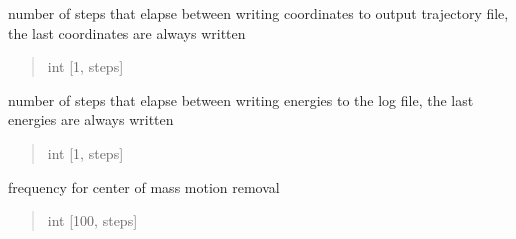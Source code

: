 \documentclass[letterpaper,10pt,english]{sphinxmanual}
\begin{document}
\begin{fulllineitems}
\begin{fulllineitems}
\end{fulllineitems}


\begin{fulllineitems}
\label{\detokenize{modules/dynamics:hps.dynamics.Dynamics.nstxout}}
\pysigstartsignatures
{}
\pysigstopsignatures
\sphinxAtStartPar
number of steps that elapse between writing coordinates to output trajectory file,
the last coordinates are always written
\begin{quote}\begin{description}
\sphinxAtStartPar
int {[}1, steps{]}

\end{description}\end{quote}

\end{fulllineitems}


\begin{fulllineitems}
\label{\detokenize{modules/dynamics:hps.dynamics.Dynamics.nstlog}}
\pysigstartsignatures
{}
\pysigstopsignatures
\sphinxAtStartPar
number of steps that elapse between writing energies to the log file, the last energies are always written
\begin{quote}\begin{description}
\sphinxAtStartPar
int {[}1, steps{]}

\end{description}\end{quote}

\end{fulllineitems}


\begin{fulllineitems}
\label{\detokenize{modules/dynamics:hps.dynamics.Dynamics.nstcomm}}
\pysigstartsignatures
{}
\pysigstopsignatures
\sphinxAtStartPar
frequency for center of mass motion removal
\begin{quote}\begin{description}
\sphinxAtStartPar
int {[}100, steps{]}


\end{description}
\end{quote}
\end{fulllineitems}
\end{fulllineitems}
\end{document}
